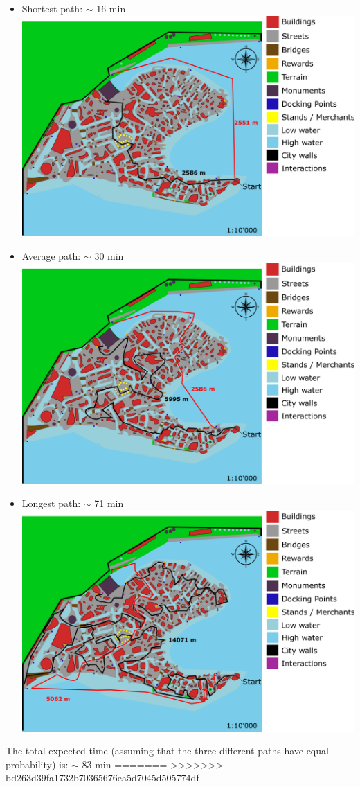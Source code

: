 \begin{itemize}
\item Shortest path: $\sim$ 16 min \\
\includegraphics[scale=0.3]{Images/Diagrams/dynamiapath1.png}
\item Average path: $\sim$ 30 min \\
\includegraphics[scale=0.3]{Images/Diagrams/dynamiapath2.png}
\item Longest path: $\sim$ 71 min \\
\includegraphics[scale=0.3]{Images/Diagrams/dynamiapath3.png}
\end{itemize}

The total expected time (assuming that the three different paths have equal probability) is:  $\sim$ 83 min
=======
>>>>>>> bd263d39fa1732b70365676ea5d7045d505774df
